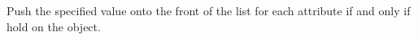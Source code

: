 Push the specified value onto the front of the list for each attribute if and
only if  hold on the object.




